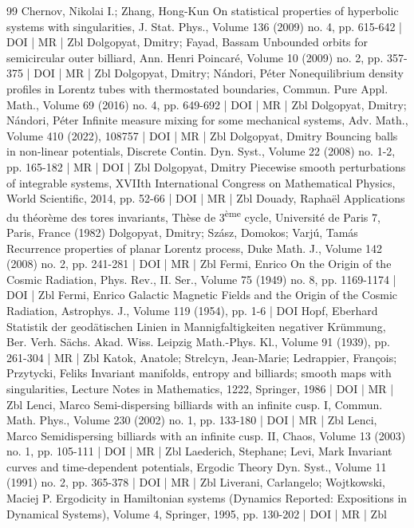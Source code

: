 \begin{thebibliography}{99}
Chernov, Nikolai I.; Zhang, Hong-Kun On statistical properties of hyperbolic systems with singularities, J. Stat. Phys., Volume 136 (2009) no. 4, pp. 615-642 | DOI | MR | Zbl
Dolgopyat, Dmitry; Fayad, Bassam Unbounded orbits for semicircular outer billiard, Ann. Henri Poincaré, Volume 10 (2009) no. 2, pp. 357-375 | DOI | MR | Zbl
Dolgopyat, Dmitry; Nándori, Péter Nonequilibrium density profiles in Lorentz tubes with thermostated boundaries, Commun. Pure Appl. Math., Volume 69 (2016) no. 4, pp. 649-692 | DOI | MR | Zbl
Dolgopyat, Dmitry; Nándori, Péter Infinite measure mixing for some mechanical systems, Adv. Math., Volume 410 (2022), 108757 | DOI | MR | Zbl
Dolgopyat, Dmitry Bouncing balls in non-linear potentials, Discrete Contin. Dyn. Syst., Volume 22 (2008) no. 1-2, pp. 165-182 | MR | DOI | Zbl
Dolgopyat, Dmitry Piecewise smooth perturbations of integrable systems, XVIIth International Congress on Mathematical Physics, World Scientific, 2014, pp. 52-66 | DOI | MR | Zbl
Douady, Raphaël Applications du théorème des tores invariants, Thèse de 3\textsuperscript{ème} cycle, Université de Paris 7, Paris, France (1982)
Dolgopyat, Dmitry; Szász, Domokos; Varjú, Tamás Recurrence properties of planar Lorentz process, Duke Math. J., Volume 142 (2008) no. 2, pp. 241-281 | DOI | MR | Zbl
Fermi, Enrico On the Origin of the Cosmic Radiation, Phys. Rev., II. Ser., Volume 75 (1949) no. 8, pp. 1169-1174 | DOI | Zbl
Fermi, Enrico Galactic Magnetic Fields and the Origin of the Cosmic Radiation, Astrophys. J., Volume 119 (1954), pp. 1-6 | DOI
Hopf, Eberhard Statistik der geodätischen Linien in Mannigfaltigkeiten negativer Krümmung, Ber. Verh. Sächs. Akad. Wiss. Leipzig Math.-Phys. Kl., Volume 91 (1939), pp. 261-304 | MR | Zbl
Katok, Anatole; Strelcyn, Jean-Marie; Ledrappier, François; Przytycki, Feliks Invariant manifolds, entropy and billiards; smooth maps with singularities, Lecture Notes in Mathematics, 1222, Springer, 1986 | DOI | MR | Zbl
Lenci, Marco Semi-dispersing billiards with an infinite cusp. I, Commun. Math. Phys., Volume 230 (2002) no. 1, pp. 133-180 | DOI | MR | Zbl
Lenci, Marco Semidispersing billiards with an infinite cusp. II, Chaos, Volume 13 (2003) no. 1, pp. 105-111 | DOI | MR | Zbl
Laederich, Stephane; Levi, Mark Invariant curves and time-dependent potentials, Ergodic Theory Dyn. Syst., Volume 11 (1991) no. 2, pp. 365-378 | DOI | MR | Zbl
Liverani, Carlangelo; Wojtkowski, Maciej P. Ergodicity in Hamiltonian systems (Dynamics Reported: Expositions in Dynamical Systems), Volume 4, Springer, 1995, pp. 130-202 | DOI | MR | Zbl

\end{thebibliography}
